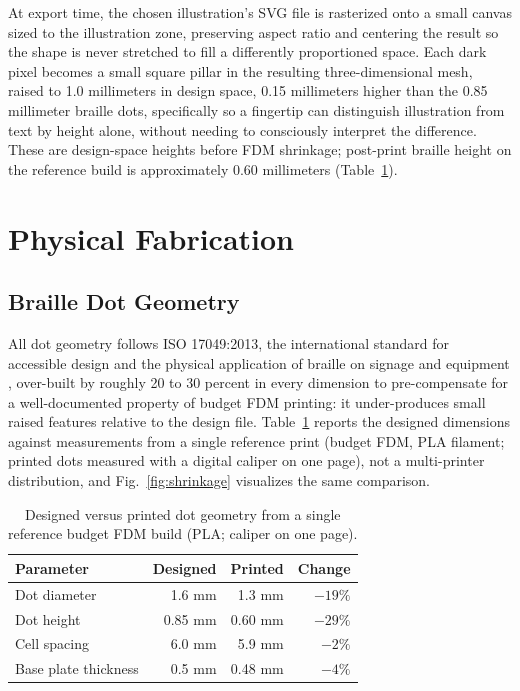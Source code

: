\documentclass[conference]{IEEEtran}
\begin{document}
At export time, the chosen illustration's SVG file is rasterized onto a small canvas sized to the illustration zone, preserving aspect ratio and centering the result so the shape is never stretched to fill a differently proportioned space. Each dark pixel becomes a small square pillar in the resulting three-dimensional mesh, raised to 1.0 millimeters in design space, 0.15 millimeters higher than the 0.85 millimeter braille dots, specifically so a fingertip can distinguish illustration from text by height alone, without needing to consciously interpret the difference. These are design-space heights before FDM shrinkage; post-print braille height on the reference build is approximately 0.60 millimeters (Table~\ref{tab:shrinkage}).

\section{Physical Fabrication}\label{sec:fabrication}

\subsection{Braille Dot Geometry}

All dot geometry follows ISO 17049:2013, the international standard for accessible design and the physical application of braille on signage and equipment \cite{iso17049}, over-built by roughly 20 to 30 percent in every dimension to pre-compensate for a well-documented property of budget FDM printing: it under-produces small raised features relative to the design file. Table~\ref{tab:shrinkage} reports the designed dimensions against measurements from a single reference print (budget FDM, PLA filament; printed dots measured with a digital caliper on one page), not a multi-printer distribution, and Fig.~\ref{fig:shrinkage} visualizes the same comparison.

\begin{table}[t]
\caption{Designed versus printed dot geometry from a single reference budget FDM build (PLA; caliper on one page).}
\label{tab:shrinkage}
\centering
\begin{tabular}{lrrr}
\toprule
Parameter & Designed & Printed & Change \\
\midrule
Dot diameter & 1.6 mm & 1.3 mm & $-19\%$ \\
Dot height & 0.85 mm & 0.60 mm & $-29\%$ \\
Cell spacing & 6.0 mm & 5.9 mm & $-2\%$ \\
Base plate thickness & 0.5 mm & 0.48 mm & $-4\%$ \\
\bottomrule
\end{tabular}
\end{table}
\end{document}
